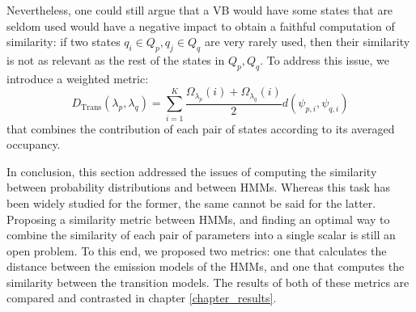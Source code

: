 \documentclass[../main.tex]{subfiles}
\begin{document}
\par Nevertheless, one could still argue that a VB would have some states that are seldom used would have a negative impact to obtain a faithful computation of similarity: if two states $q_i \in Q_p, q_j \in Q_q$ are very rarely used, then their similarity is not as relevant as the rest of the states in $Q_p, Q_q$. To address this issue, we introduce a weighted metric:
\begin{equation} \label{eq:hmmdist}
D_{\text{Trans}}(\lambda_p, \lambda_q) = \sum_{i=1}^K \frac{\Omega_{\lambda_p}(i) + \Omega_{\lambda_q}(i)}{2} d(\psi_{p, i}, \psi_{q, i})
\end{equation}
that combines the contribution of each pair of states according to its averaged occupancy.
\par In conclusion, this section addressed the issues of computing the similarity between probability distributions and between HMMs. Whereas this task has been widely studied for the former, the same cannot be said for the latter. Proposing a similarity metric between HMMs, and finding an optimal way to combine the similarity of each pair of parameters into a single scalar is still an open problem. To this end, we proposed two metrics: one that calculates the distance between the emission models of the HMMs, and one that computes the similarity between the transition models. The results of both of these metrics are compared and contrasted in chapter \ref{chapter_results}.
\end{document}
